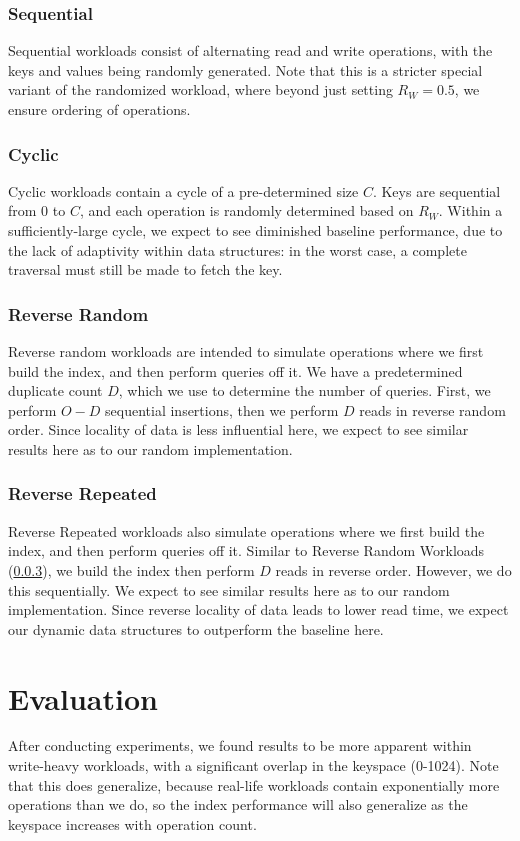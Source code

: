 \documentclass[sigconf]{acmart}
\begin{document}
\subsubsection{Sequential}
Sequential workloads consist of alternating read and write operations, with the keys and values being randomly generated. Note that this is a stricter special variant of the randomized workload, where beyond just setting $R_W=0.5$, we ensure ordering of operations.

\subsubsection{Cyclic}
Cyclic workloads contain a cycle of a pre-determined size $C$. Keys are sequential from $0$ to $C$, and each operation is randomly determined based on $R_W$. Within a sufficiently-large cycle, we expect to see diminished baseline performance, due to the lack of adaptivity within data structures: in the worst case, a complete traversal must still be made to fetch the key.

\subsubsection{Reverse Random}
\label{reverse_random}
Reverse random workloads are intended to simulate operations where we first build the index, and then perform queries off it. We have a predetermined duplicate count $D$, which we use to determine the number of queries. First, we perform $O-D$ sequential insertions, then we perform $D$ reads in reverse random order. Since locality of data is less influential here, we expect to see similar results here as to our random implementation.

\subsubsection{Reverse Repeated}
Reverse Repeated workloads also simulate operations where we first build the index, and then perform queries off it. Similar to Reverse Random Workloads (\ref{reverse_random}), we build the index then perform $D$ reads in reverse order. However, we do this sequentially. We expect to see similar results here as to our random implementation. Since reverse locality of data leads to lower read time, we expect our dynamic data structures to outperform the baseline here.

\section{Evaluation}
After conducting experiments, we found results to be more apparent within write-heavy workloads, with a significant overlap in the keyspace (0-1024). Note that this does generalize, because real-life workloads contain exponentially more operations than we do, so the index performance will also generalize as the keyspace increases with operation count.
\end{document}
